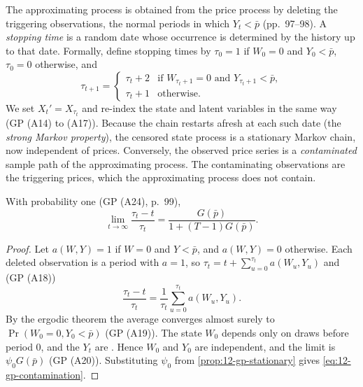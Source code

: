 The approximating process is obtained from the price process by deleting the triggering observations, the normal
periods in which $Y_t < \bar p$ (pp.~97--98). A \emph{stopping time} is a random date whose occurrence is determined
by the history up to that date. Formally, define stopping times by $\tau_0 = 1$ if $W_0 = 0$ and $Y_0 < \bar p$,
$\tau_0 = 0$ otherwise, and
\begin{equation*}
\tau_{t+1} =
\begin{cases}
\tau_t + 2 & \text{if } W_{\tau_t + 1} = 0 \text{ and } Y_{\tau_t + 1} < \bar p,\\
\tau_t + 1 & \text{otherwise.}
\end{cases}
\end{equation*}
We set $X_t' = X_{\tau_t}$ and re-index the state and latent variables in the same way (GP (A14) to (A17)). Because
the chain restarts afresh at each such date (the \emph{strong Markov property}), the censored state process is a
stationary Markov chain, now independent of prices.
Conversely, the observed price series is a \emph{contaminated} sample path of the approximating process. The
contaminating observations are the triggering prices, which the approximating process does not contain.

\begin{proposition}\label{prop:12-gp-contamination}
With probability one (GP (A24), p.~99),
\begin{equation}\label{eq:12-gp-contamination}
\lim_{t \to \infty}\frac{\tau_t - t}{\tau_t} = \frac{G(\bar p)}{1 + (T - 1)G(\bar p)} .
\end{equation}
\end{proposition}

\begin{proof}
Let $a(W, Y) = 1$ if $W = 0$ and $Y < \bar p$, and $a(W, Y) = 0$ otherwise. Each deleted observation is a period
with $a = 1$, so $\tau_t = t + \sum_{u=0}^{\tau_t}a(W_u, Y_u)$ and (GP (A18))
\begin{equation*}
\frac{\tau_t - t}{\tau_t} = \frac{1}{\tau_t}\sum_{u=0}^{\tau_t}a(W_u, Y_u) .
\end{equation*}
By the ergodic theorem the average converges almost surely to $\Pr(W_0 = 0, Y_0 < \bar p)$ (GP (A19)). The state
$W_0$ depends only on draws before period 0, and the $Y_t$ are \iid. Hence $W_0$ and $Y_0$ are independent, and the
limit is $\psi_0 G(\bar p)$ (GP (A20)). Substituting $\psi_0$ from
\cref{prop:12-gp-stationary} gives \eqref{eq:12-gp-contamination}.
\end{proof}

